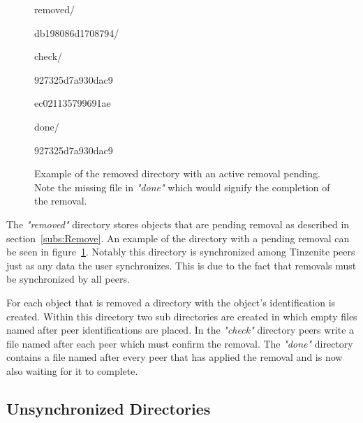 \begin{figure}[htp]
\begin{modellist}
\item removed/
\begin{modellist}
    \item db198086d1708794/
    \begin{modellist}
        \item check/
        \begin{modellist}
            \item 927325d7a930dac9
            \item ec021135799691ae
        \end{modellist}
        \item done/
        \begin{modellist}
            \item 927325d7a930dac9
        \end{modellist}
    \end{modellist}
\end{modellist}
\end{modellist}
\caption[Removed Folder Structure]{Example of the removed directory with an active removal pending. Note the missing file in \textit{"done"} which would signify the completion of the removal.}
\label{list:removed_folder}
\end{figure}

The \textit{"removed"} directory stores objects that are pending removal as described in section~\ref{subs:Remove}.
An example of the directory with a pending removal can be seen in figure~\ref{list:removed_folder}.
Notably this directory is synchronized among Tinzenite peers just as any data the user synchronizes.
This is due to the fact that removals must be synchronized by all peers.

For each object that is removed a directory with the object's identification is created.
Within this directory two sub directories are created in which empty files named after peer identifications are placed.
In the \textit{"check"} directory peers write a file named after each peer which must confirm the removal.
The \textit{"done"} directory contains a file named after every peer that has applied the removal and is now also waiting for it to complete.

\subsection{Unsynchronized Directories}
\label{sub:Unsynchronized Directories}

